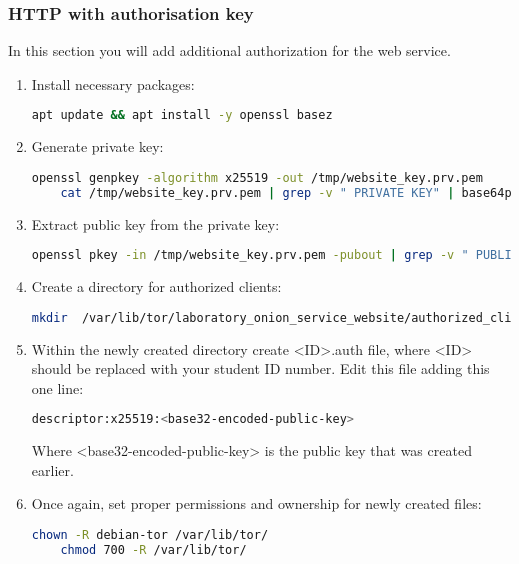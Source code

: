 \subsubsection{HTTP with authorisation key}
In this section you will add additional authorization for the web service.
\begin{enumerate}
    \item Install necessary packages:
    \begin{lstlisting}[language=bash]
    apt update && apt install -y openssl basez
    \end{lstlisting}
    \item Generate private key:
    \begin{lstlisting}[language=bash, breaklines=true, breakatwhitespace=true]
    openssl genpkey -algorithm x25519 -out /tmp/website_key.prv.pem
    cat /tmp/website_key.prv.pem | grep -v " PRIVATE KEY" | base64pem -d | tail --bytes=32 | base32 | sed 's/=//g' > /tmp/website_key.prv.key
    \end{lstlisting}
    \item Extract public key from the private key:
    \begin{lstlisting}[language=bash, breaklines=true, breakatwhitespace=true]
    openssl pkey -in /tmp/website_key.prv.pem -pubout | grep -v " PUBLIC KEY" | base64pem -d | tail --bytes=32 | base32 | sed 's/=//g' > /tmp/website_key.pub.key
    \end{lstlisting}
    \item Create a directory for authorized clients:
    \begin{lstlisting}[language=bash, breaklines=true, breakatwhitespace=true, columns=flexible]
    mkdir  /var/lib/tor/laboratory_onion_service_website/authorized_clients/
    \end{lstlisting}
    \item Within the newly created directory create <ID>.auth file, where <ID> should be replaced with your student ID number. Edit this file adding this one line:
    \begin{lstlisting}[language=bash]
    descriptor:x25519:<base32-encoded-public-key>
    \end{lstlisting}
    Where <base32-encoded-public-key> is the public key that was created earlier.
    \item Once again, set proper permissions and ownership for newly created files:
    \begin{lstlisting}[language=bash]
    chown -R debian-tor /var/lib/tor/
    chmod 700 -R /var/lib/tor/

\end{lstlisting}
\end{enumerate}
